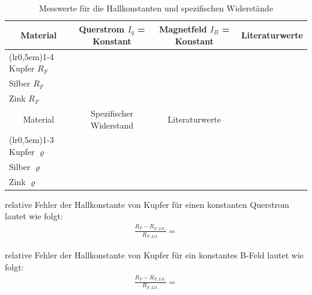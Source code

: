 \begin{table}[H]
\centering
    \begin{tabular}{l r r r}
    \toprule
        \multicolumn{1}{c}{Material} & \multicolumn{1}{c}{Querstrom $I_q$ = Konstant} & 
        \multicolumn{1}{c}{Magnetfeld $I_B$ = Konstant} & \multicolumn{1}{c}{Literaturwerte}\\
    \cmidrule(lr{0,5em}){1-4}
        Kupfer $R_F$ & \text{} & \text{} & \text{} \\
        Silber $R_F$ & \text{} & \text{} & \text{} \\
        Zink $R_F$   & \text{} & \text{} & \text{} \\
    \toprule
        \multicolumn{1}{c}{Material} & \multicolumn{1}{c}{Spezifischer Widerstand} & 
        \multicolumn{1}{c}{Literaturwerte} & \multicolumn{1}{c}{}\\
    \cmidrule(lr{0,5em}){1-3}
        Kupfer $\varrho$ & \text{} & \text{} & \\
        Silber $\varrho$ & \text{} & \text{} & \\
        Zink $\varrho$   & \text{} &                                & \\
    \bottomrule
    \end{tabular}
\caption{Messwerte für die Hallkonstanten und spezifischen Widerstände}
\label{tab:1}
\end{table}


\justifying relative Fehler der Hallkonstante von Kupfer für einen konstanten Querstrom lautet wie folgt:
\begin{align}
    \frac{R_F - R_{F,Lit.}}{R_{F,Lit.}} = \text{}
\end{align}

\justifying relative Fehler der Hallkonstante von Kupfer für ein konstantes B-Feld lautet wie folgt:
\begin{align}
    \frac{R_F - R_{F,Lit.}}{R_{F,Lit.}} = \text{}
\end{align}

